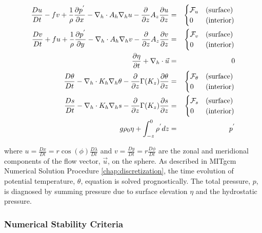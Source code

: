 \begin{eqnarray}
\label{EQ:eg-hs-model_equations}
\frac{Du}{Dt} - fv + 
  \frac{1}{\rho}\frac{\partial p^{'}}{\partial x} - 
  \nabla_{h}\cdot A_{h}\nabla_{h}u - 
  \frac{\partial}{\partial z}A_{z}\frac{\partial u}{\partial z} 
 & = &
\begin{cases}
{\cal F}_u & \text{(surface)} \\
0 & \text{(interior)}
\end{cases}
\\
\frac{Dv}{Dt} + fu + 
  \frac{1}{\rho}\frac{\partial p^{'}}{\partial y} - 
  \nabla_{h}\cdot A_{h}\nabla_{h}v - 
  \frac{\partial}{\partial z}A_{z}\frac{\partial v}{\partial z} 
& = &
\begin{cases}
{\cal F}_v & \text{(surface)} \\
0 & \text{(interior)}
\end{cases}
\\
\frac{\partial \eta}{\partial t} + \nabla_{h}\cdot \vec{u}
&=&
0
\\
\frac{D\theta}{Dt} -
 \nabla_{h}\cdot K_{h}\nabla_{h}\theta
 - \frac{\partial}{\partial z}\Gamma(K_{z})\frac{\partial\theta}{\partial z} 
& = &
\begin{cases}
{\cal F}_\theta & \text{(surface)} \\
0 & \text{(interior)}
\end{cases}
\\
\frac{D s}{Dt} -
 \nabla_{h}\cdot K_{h}\nabla_{h}s
 - \frac{\partial}{\partial z}\Gamma(K_{z})\frac{\partial s}{\partial z} 
& = &
\begin{cases}
{\cal F}_s & \text{(surface)} \\
0 & \text{(interior)}
\end{cases}
\\
g\rho_{0} \eta + \int^{0}_{-z}\rho^{'} dz & = & p^{'}
\end{eqnarray}

\noindent where $u=\frac{Dx}{Dt}=r \cos(\phi)\frac{D \lambda}{Dt}$ and 
$v=\frac{Dy}{Dt}=r \frac{D \phi}{Dt}$ 
are the zonal and meridional components of the
flow vector, $\vec{u}$, on the sphere. As described in
MITgcm Numerical Solution Procedure \ref{chap:discretization}, the time 
evolution of potential temperature, $\theta$, equation is solved prognostically.
The total pressure, $p$, is diagnosed by summing pressure due to surface 
elevation $\eta$ and the hydrostatic pressure.
\\

\subsubsection{Numerical Stability Criteria}
\label{www:tutorials}

